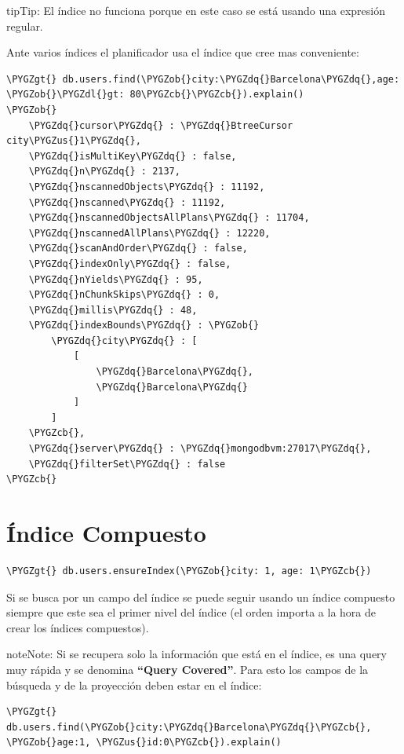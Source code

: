 \documentclass[a4paper,10pt,english]{sphinxmanual}
\def\PYGZus{\char`\_}
\def\PYGZob{\char`\{}
\def\PYGZcb{\char`\}}
\def\PYGZgt{\char`\>}
\def\PYGZdl{\char`\$}
\def\PYGZdq{\char`\"}
\begin{document}
\begin{notice}{tip}{Tip:}
El índice no funciona porque en este caso se está usando una expresión regular.
\end{notice}

Ante varios índices el planificador usa el índice que cree mas conveniente:

\begin{Verbatim}[commandchars=\\\{\}]
\PYGZgt{} db.users.find(\PYGZob{}city:\PYGZdq{}Barcelona\PYGZdq{},age: \PYGZob{}\PYGZdl{}gt: 80\PYGZcb{}\PYGZcb{}).explain()
\PYGZob{}
    \PYGZdq{}cursor\PYGZdq{} : \PYGZdq{}BtreeCursor city\PYGZus{}1\PYGZdq{},
    \PYGZdq{}isMultiKey\PYGZdq{} : false,
    \PYGZdq{}n\PYGZdq{} : 2137,
    \PYGZdq{}nscannedObjects\PYGZdq{} : 11192,
    \PYGZdq{}nscanned\PYGZdq{} : 11192,
    \PYGZdq{}nscannedObjectsAllPlans\PYGZdq{} : 11704,
    \PYGZdq{}nscannedAllPlans\PYGZdq{} : 12220,
    \PYGZdq{}scanAndOrder\PYGZdq{} : false,
    \PYGZdq{}indexOnly\PYGZdq{} : false,
    \PYGZdq{}nYields\PYGZdq{} : 95,
    \PYGZdq{}nChunkSkips\PYGZdq{} : 0,
    \PYGZdq{}millis\PYGZdq{} : 48,
    \PYGZdq{}indexBounds\PYGZdq{} : \PYGZob{}
        \PYGZdq{}city\PYGZdq{} : [
            [
                \PYGZdq{}Barcelona\PYGZdq{},
                \PYGZdq{}Barcelona\PYGZdq{}
            ]
        ]
    \PYGZcb{},
    \PYGZdq{}server\PYGZdq{} : \PYGZdq{}mongodbvm:27017\PYGZdq{},
    \PYGZdq{}filterSet\PYGZdq{} : false
\PYGZcb{}
\end{Verbatim}


\section{Índice Compuesto}
\label{contents/optimizing:indice-compuesto}
\begin{Verbatim}[commandchars=\\\{\}]
\PYGZgt{} db.users.ensureIndex(\PYGZob{}city: 1, age: 1\PYGZcb{})
\end{Verbatim}

Si se busca por un campo del índice se puede seguir usando un índice compuesto
siempre que este sea el primer nivel del índice (el orden importa a la hora de crear los índices compuestos).

\begin{notice}{note}{Note:}
Si se recupera solo la información que está en el índice, es una query muy rápida y se denomina \textbf{``Query Covered''}. Para esto los campos de la búsqueda y de la proyección deben estar en el índice:

\begin{Verbatim}[commandchars=\\\{\}]
\PYGZgt{} db.users.find(\PYGZob{}city:\PYGZdq{}Barcelona\PYGZdq{}\PYGZcb{}, \PYGZob{}age:1, \PYGZus{}id:0\PYGZcb{}).explain()
\end{Verbatim}
\end{notice}
\end{document}
